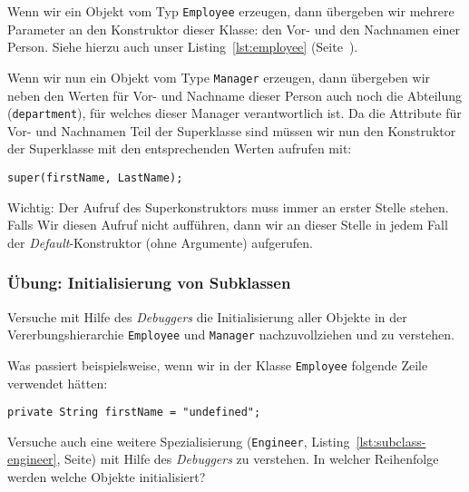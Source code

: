 Wenn wir ein Objekt vom Typ \texttt{Employee} erzeugen, dann übergeben wir mehrere Parameter
an den Konstruktor dieser Klasse: den Vor- und den Nachnamen einer Person. Siehe hierzu
auch unser Listing~\ref{lst:employee} (Seite~\pageref{lst:employee}).

Wenn wir nun ein Objekt vom Type \texttt{Manager} erzeugen, dann übergeben wir neben den
Werten für Vor- und Nachname dieser Person auch noch die Abteilung (\texttt{department}), für
welches dieser Manager verantwortlich ist. Da die Attribute für Vor- und Nachnamen Teil
der Superklasse sind müssen wir nun den Konstruktor der Superklasse mit den entsprechenden
Werten aufrufen mit:

\texttt{super(firstName, LastName);}

Wichtig: Der Aufruf des Superkonstruktors muss immer an erster Stelle stehen. Falls
Wir diesen Aufruf nicht aufführen, dann wir an dieser Stelle in jedem Fall der
\emph{Default}-Konstruktor (ohne Argumente) aufgerufen.

\begin{Exercise}[%
title={Initialisierung von Subklassen},
label={ex:init-subclasses}]

    \begin{frame}[fragile]
        \frametitle<presentation>{Übung: Initialisierung von Subklassen}
        Versuche mit Hilfe des \emph{Debuggers} die Initialisierung aller Objekte in der
        Vererbungshierarchie \texttt{Employee} und \texttt{Manager} nachzuvollziehen und
        zu verstehen.

        Was passiert beispielsweise, wenn wir in der Klasse \texttt{Employee} folgende
        Zeile verwendet hätten:

        \texttt{private String firstName = "undefined";}
    \end{frame}

    Versuche auch eine weitere Spezialisierung (\texttt{Engineer},
    Listing~\ref{lst:subclass-engineer}, Seite\pageref{lst:subclass-engineer})
    mit Hilfe des \emph{Debuggers} zu verstehen.
    In welcher Reihenfolge werden welche Objekte initialisiert?

\end{Exercise}



